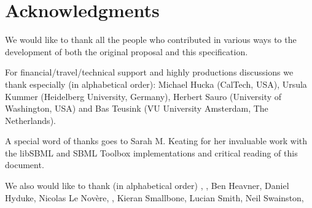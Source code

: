 
\section{Acknowledgments}

We would like to thank all the people who contributed in various ways to the development of both the original proposal and this specification.

For financial/travel/technical support and highly productions discussions we thank especially (in alphabetical order): Michael Hucka (CalTech, USA), Ursula Kummer (Heidelberg University, Germany), Herbert Sauro (University of Washington, USA) and Bas Teusink (VU University Amsterdam, The Netherlands).

A special word of thanks goes to Sarah M. Keating for her invaluable work with the \textsf{libSBML} and \textsf{SBML Toolbox} implementations and critical reading of this document.

We also would like to thank (in alphabetical order) , , Ben Heavner, Daniel Hyduke, Nicolas Le Nov\`{e}re, , Kieran Smallbone, Lucian Smith, Neil Swainston, 



